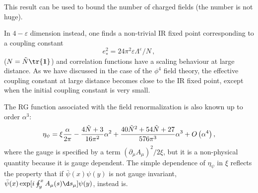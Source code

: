 This result can be used to bound the number of charged fields
(the number is not huge).\par
In $4-\varepsilon$ dimension
instead, one finds a non-trivial  IR fixed point corresponding to
a coupling constant
$$e^2_*=24 \pi^2 \varepsilon\Lambda^{\varepsilon}/N\,,$$
($N={\tilde N}\tr{\bf 1}$) and  correlation functions have a
scaling behaviour at large distance. As we have discussed in the
case of the $\phi^4$ field  theory, the effective coupling
constant at large distance becomes close to the IR fixed  point,
except when the  initial coupling constant is very small.
\par
The RG function associated  with the field renormalization is also
known up to order $\alpha^3$:
$$\eta_\psi= \xi {\alpha\over2\pi}-{4{\tilde N}+3\over 16\pi^2}\alpha^2+{40 {\tilde N}^2 +
54{\tilde N}+27 \over 576\pi^3}\alpha^3+O\left(\alpha^4\right),$$
where the gauge is specified by a term $(\partial_\mu
A_\mu)^2/2\xi$,  but it is a non-physical quantity because
it is gauge dependent. The simple dependence of $\eta _\psi$ in $\xi$ reflects the property that
if $\bar\psi(x)\psi(y)$ is not gauge invariant, $\bar\psi(x)\exp[i\oint_y^x A_\mu(s)\d s_\mu]\psi(y) $, instead is.

